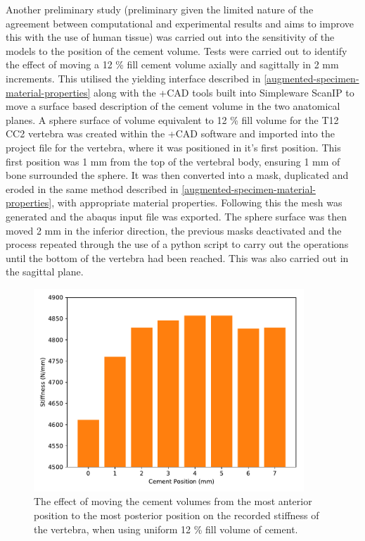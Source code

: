 Another preliminary study (preliminary given the limited nature of the
agreement between computational and experimental results and aims to improve
this with the use of human tissue) was carried out into the sensitivity of the
models to the position of the cement volume.  Tests were carried out to
identify the effect of moving a 12 \% fill cement volume axially and sagittally
in 2 mm increments.  This utilised the yielding interface described in
\cref{augmented-specimen-material-properties} along with the +CAD tools built
into Simpleware ScanIP to move a surface based description of the cement volume
in the two anatomical planes.  A sphere surface of volume equivalent to 12 \%
fill volume for the T12 CC2 vertebra was created within the +CAD software and
imported into the project file for the vertebra, where it was positioned in
it's first position.  This first position was 1 mm from the top of the
vertebral body, ensuring 1 mm of bone surrounded the sphere.  It was then
converted into a mask, duplicated and eroded in the same method described in
\cref{augmented-specimen-material-properties}, with appropriate material
properties.  Following this the mesh was generated and the abaqus input file
was exported.  The sphere surface was then moved 2 mm in the inferior
direction, the previous masks deactivated and the process repeated through the
use of a python script to carry out the operations until the bottom of the
vertebra had been reached.  This was also carried out in the sagittal plane. 


\begin{figure}[ht!]

\centering
\includegraphics[width=4in]{images/xaxis_mv_cmt.pdf}
\caption{The effect of moving the cement volumes from the most anterior position to the most posterior position on the recorded stiffness of the vertebra, when using uniform 12 \% fill volume of cement. }
	\label{fig:xaxis_mv_cmt}
\end{figure}

